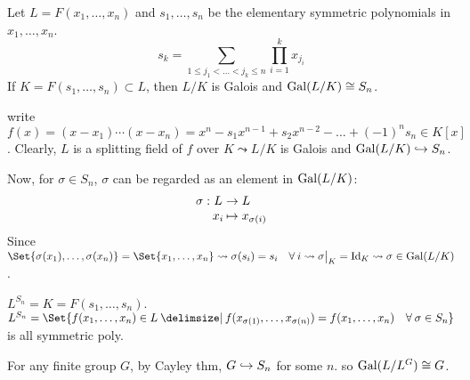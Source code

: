 \begin{lemma} \label{lemma:symm-poly-symm-group}
  Let $L = F(x_1, \dots, x_n)$ and $s_1, \dots, s_n$ be the elementary
  symmetric polynomials in $x_1, \dots, x_n$.
  \[
    s_k = \sum_{1 \le j_1 < \dots < j_k \le n} \prod_{i=1}^k x_{j_i}
  \]
  If $K = F(s_1, \dots, s_n) \subset L$, then $L/K$ is Galois and
  $\operatorname{Gal}(L/K) \cong S_n$.

  write $f(x) = (x - x_1) \cdots (x - x_n) = x^n - s_1x^{n-1} + s_2x^{n-2} -
  \dots + (-1)^ns_n \in K[x]$.
  Clearly, $L$ is a splitting field of $f$ over $K \leadsto L/K$ is Galois
  and $\operatorname{Gal}(L/K) \hookrightarrow S_n$.

  Now, for $\sigma \in S_n$, $\sigma$ can be regarded as an element in
  $\operatorname{Gal}(L/K)$:
  \[
    \arraycolsep=1pt
    \begin{array}{rcl}
      \sigma: & L & \to L \\
              & x_i & \mapsto x_{\sigma(i)}
    \end{array}
  \]
  Since $\Set{ \sigma(x_1), \dots, \sigma(x_n) } = \Set{ x_1, \dots, x_n }
  \leadsto \sigma(s_i) = s_i \quad \forall i \leadsto \sigma\big|_K = \Id_K
  \leadsto \sigma \in \Gal(L/K)$.
\end{lemma}

\begin{coro}
  $L^{S_n} = K = F(s_1, \dots, s_n)$. \\
  $L^{S_n} = \Set{ f(x_1, \dots, x_n) \in L \given f(x_{\sigma(1)}, \dots,
  x_{\sigma(n)}) = f(x_1, \dots, x_n) \quad \forall \sigma \in S_n }$ is
  all symmetric poly.
\end{coro}

\begin{coro}
  For any finite group $G$, by Cayley thm, $G \hookrightarrow S_n$ for some $n$.
  so $\operatorname{Gal}(L/L^G) \cong G$.
\end{coro}

